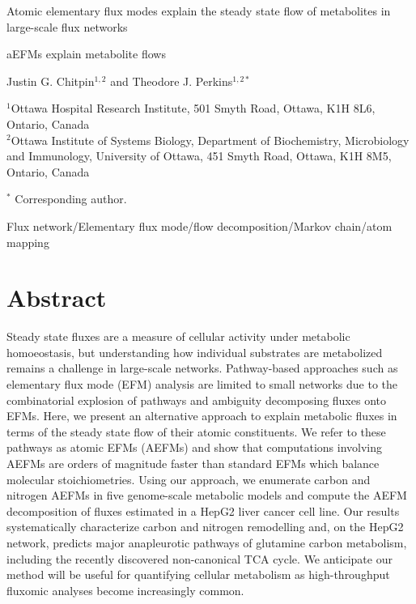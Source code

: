 \documentclass[12pt]{article}
\begin{document}
\begin{titlepage}
    \begin{center}
        \vspace*{1cm}

        Atomic elementary flux modes explain the steady state flow of
        metabolites in large-scale flux networks

        \vspace{1.0cm}
        aEFMs explain metabolite flows
            
        \vspace{1.0cm}

        Justin G. Chitpin$^{1,2}$ and Theodore J. Perkins$^{1,2*}$

        \vspace{1.0cm}

        $^1$Ottawa Hospital Research Institute, 501 Smyth Road, Ottawa, K1H 8L6, Ontario, Canada\\
        $^2$Ottawa Institute of Systems Biology, Department of Biochemistry, Microbiology and Immunology, University of Ottawa, 451 Smyth Road, Ottawa, K1H 8M5, Ontario, Canada
           
        \vspace{0.5cm}

        $^*$ Corresponding author.

        \vspace{1.0cm}
     
        Flux network/Elementary flux mode/flow decomposition/Markov chain/atom mapping
            
   \end{center}
\end{titlepage}

\clearpage

\section*{Abstract} %

Steady state fluxes are a measure of cellular activity under metabolic
homoeostasis, but understanding how individual substrates are metabolized
remains a challenge in large-scale networks. Pathway-based approaches such
as elementary flux mode (EFM) analysis are limited to small networks due
to the combinatorial explosion of pathways and ambiguity decomposing
fluxes onto EFMs. Here, we present an alternative approach to explain
metabolic fluxes in terms of the steady state flow of their atomic 
constituents. We refer to these pathways as atomic EFMs (AEFMs) and show
that computations involving AEFMs are orders of magnitude faster than
standard EFMs which balance molecular stoichiometries. Using our approach,
we enumerate carbon and nitrogen AEFMs in five genome-scale metabolic
models and compute the AEFM decomposition of fluxes estimated in a HepG2
liver cancer cell line. Our results systematically characterize carbon and
nitrogen remodelling and, on the HepG2 network, predicts major
anapleurotic pathways of glutamine carbon metabolism, including the
recently discovered non-canonical TCA cycle. We anticipate our method will
be useful for quantifying cellular metabolism as high-throughput fluxomic
analyses become increasingly common.
\end{document}
